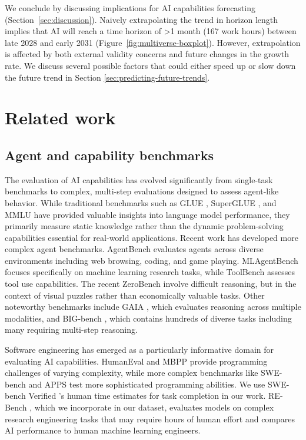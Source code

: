 \documentclass{article}
\begin{document}
We conclude by discussing implications for AI capabilities forecasting (Section~\ref{sec:discussion}). Naively extrapolating the trend in horizon length implies that AI will reach a time horizon of \textgreater 1 month (167 work hours) between late 2028 and early 2031 (Figure~\ref{fig:multiverse-boxplot}). However, extrapolation is affected by both external validity concerns and future changes in the growth rate. We discuss several possible factors that could either speed up or slow down the future trend in Section \ref{sec:predicting-future-trends}.

\section{Related work}

\subsection{Agent and capability benchmarks}
The evaluation of AI capabilities has evolved significantly from single-task benchmarks to complex, multi-step evaluations designed to assess agent-like behavior. While traditional benchmarks such as GLUE \citep{wang2018glue}, SuperGLUE \citep{wang2019superglue}, and MMLU \citep{hendrycks2020measuring} have provided valuable insights into language model performance, they primarily measure static knowledge rather than the dynamic problem-solving capabilities essential for real-world applications.
Recent work has developed more complex agent benchmarks. AgentBench \citep{liu2023agentbench} evaluates agents across diverse environments including web browsing, coding, and game playing. MLAgentBench \citep{huang2024mlagentbench} focuses specifically on machine learning research tasks, while ToolBench \citep{qin2023toolllm} assesses tool use capabilities. The recent ZeroBench \citep{roberts2025zerobench} involve difficult reasoning, but in the context of visual puzzles rather than economically valuable tasks. Other noteworthy benchmarks include GAIA \citep{mialon2024gaia}, which evaluates reasoning across multiple modalities, and BIG-bench \citep{srivastava2022beyond}, which contains hundreds of diverse tasks including many requiring multi-step reasoning.

Software engineering has emerged as a particularly informative domain for evaluating AI capabilities. HumanEval \citep{chen2021evaluating} and MBPP \citep{austin2021program} provide programming challenges of varying complexity, while more complex benchmarks like SWE-bench \citep{jimenez2024swebench} and APPS \citep{hendrycks2021measuring} test more sophisticated programming abilities. We use SWE-bench Verified \citep{chowdhury2024SWEbench}'s human time estimates for task completion in our work. RE-Bench \citep{wijk2024re}, which we incorporate in our dataset, evaluates models on complex research engineering tasks that may require hours of human effort and compares AI performance to human machine learning engineers. 
\end{document}
